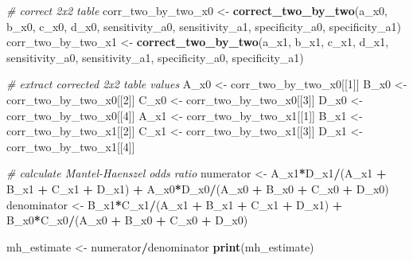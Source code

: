 \documentclass[
]{book}
\newenvironment{Shaded}{\begin{snugshade}}{\end{snugshade}}
\newcommand{\CommentTok}[1]{\textcolor[rgb]{0.56,0.35,0.01}{\textit{#1}}}
\newcommand{\DecValTok}[1]{\textcolor[rgb]{0.00,0.00,0.81}{#1}}
\newcommand{\FunctionTok}[1]{\textcolor[rgb]{0.13,0.29,0.53}{\textbf{#1}}}
\newcommand{\NormalTok}[1]{#1}
\newcommand{\OtherTok}[1]{\textcolor[rgb]{0.56,0.35,0.01}{#1}}
\newcommand{\SpecialCharTok}[1]{\textcolor[rgb]{0.81,0.36,0.00}{\textbf{#1}}}
\begin{document}
\begin{Shaded}
\begin{Highlighting}[]
\CommentTok{\# correct 2x2 table }
\NormalTok{corr\_two\_by\_two\_x0 }\OtherTok{\textless{}{-}} \FunctionTok{correct\_two\_by\_two}\NormalTok{(a\_x0, b\_x0, c\_x0, d\_x0, sensitivity\_a0, sensitivity\_a1, specificity\_a0, specificity\_a1)}
\NormalTok{corr\_two\_by\_two\_x1 }\OtherTok{\textless{}{-}} \FunctionTok{correct\_two\_by\_two}\NormalTok{(a\_x1, b\_x1, c\_x1, d\_x1, sensitivity\_a0, sensitivity\_a1, specificity\_a0, specificity\_a1)}

\CommentTok{\# extract corrected 2x2 table values}
\NormalTok{A\_x0 }\OtherTok{\textless{}{-}}\NormalTok{ corr\_two\_by\_two\_x0[[}\DecValTok{1}\NormalTok{]]}
\NormalTok{B\_x0 }\OtherTok{\textless{}{-}}\NormalTok{ corr\_two\_by\_two\_x0[[}\DecValTok{2}\NormalTok{]]}
\NormalTok{C\_x0 }\OtherTok{\textless{}{-}}\NormalTok{ corr\_two\_by\_two\_x0[[}\DecValTok{3}\NormalTok{]]}
\NormalTok{D\_x0 }\OtherTok{\textless{}{-}}\NormalTok{ corr\_two\_by\_two\_x0[[}\DecValTok{4}\NormalTok{]]}
\NormalTok{A\_x1 }\OtherTok{\textless{}{-}}\NormalTok{ corr\_two\_by\_two\_x1[[}\DecValTok{1}\NormalTok{]]}
\NormalTok{B\_x1 }\OtherTok{\textless{}{-}}\NormalTok{ corr\_two\_by\_two\_x1[[}\DecValTok{2}\NormalTok{]]}
\NormalTok{C\_x1 }\OtherTok{\textless{}{-}}\NormalTok{ corr\_two\_by\_two\_x1[[}\DecValTok{3}\NormalTok{]]}
\NormalTok{D\_x1 }\OtherTok{\textless{}{-}}\NormalTok{ corr\_two\_by\_two\_x1[[}\DecValTok{4}\NormalTok{]]}

\CommentTok{\# calculate Mantel{-}Haenszel odds ratio}
\NormalTok{numerator }\OtherTok{\textless{}{-}}\NormalTok{ A\_x1}\SpecialCharTok{*}\NormalTok{D\_x1}\SpecialCharTok{/}\NormalTok{(A\_x1 }\SpecialCharTok{+}\NormalTok{ B\_x1 }\SpecialCharTok{+}\NormalTok{ C\_x1 }\SpecialCharTok{+}\NormalTok{ D\_x1) }\SpecialCharTok{+}\NormalTok{ A\_x0}\SpecialCharTok{*}\NormalTok{D\_x0}\SpecialCharTok{/}\NormalTok{(A\_x0 }\SpecialCharTok{+}\NormalTok{ B\_x0 }\SpecialCharTok{+}\NormalTok{ C\_x0 }\SpecialCharTok{+}\NormalTok{ D\_x0)}
\NormalTok{denominator }\OtherTok{\textless{}{-}}\NormalTok{ B\_x1}\SpecialCharTok{*}\NormalTok{C\_x1}\SpecialCharTok{/}\NormalTok{(A\_x1 }\SpecialCharTok{+}\NormalTok{ B\_x1 }\SpecialCharTok{+}\NormalTok{ C\_x1 }\SpecialCharTok{+}\NormalTok{ D\_x1) }\SpecialCharTok{+}\NormalTok{ B\_x0}\SpecialCharTok{*}\NormalTok{C\_x0}\SpecialCharTok{/}\NormalTok{(A\_x0 }\SpecialCharTok{+}\NormalTok{ B\_x0 }\SpecialCharTok{+}\NormalTok{ C\_x0 }\SpecialCharTok{+}\NormalTok{ D\_x0)}

\NormalTok{mh\_estimate }\OtherTok{\textless{}{-}}\NormalTok{ numerator}\SpecialCharTok{/}\NormalTok{denominator}
\FunctionTok{print}\NormalTok{(mh\_estimate)}
\end{Highlighting}
\end{Shaded}
\end{document}
